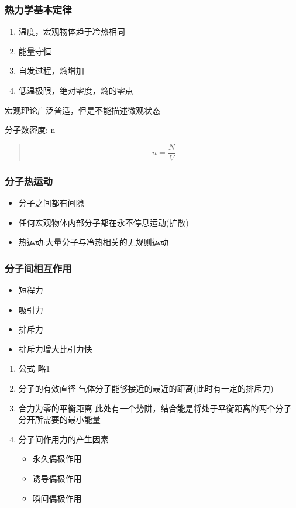 \documentclass[11pt]{article}
\begin{document}
\subsubsection{热力学基本定律}
\label{sec:org59aab5b}
\begin{enumerate}
\item 温度，宏观物体趋于冷热相同
\item 能量守恒
\item 自发过程，熵增加
\item 低温极限，绝对零度，熵的零点
\end{enumerate}

宏观理论广泛普适，但是不能描述微观状态

分子数密度: n
\begin{quote}
\[
n=\frac{N}{V}
\]
\end{quote}

\subsubsection{分子热运动}
\label{sec:org57e761c}
\begin{itemize}
\item 分子之间都有间隙
\item 任何宏观物体内部分子都在永不停息运动(扩散)
\item 热运动:大量分子与冷热相关的无规则运动
\end{itemize}
\subsubsection{分子间相互作用}
\label{sec:org0f028f2}
\begin{itemize}
\item 短程力
\item 吸引力
\item 排斥力
\item 排斥力增大比引力快
\end{itemize}
\begin{enumerate}
\item 公式
\label{sec:orgd2eaaf7}
略1
\item 分子的有效直径
\label{sec:org21d676b}
气体分子能够接近的最近的距离(此时有一定的排斥力)
\item 合力为零的平衡距离
\label{sec:org4580c02}
此处有一个势阱，结合能是将处于平衡距离的两个分子
分开所需要的最小能量
\item 分子间作用力的产生因素
\label{sec:org70cd749}
\begin{itemize}
\item 永久偶极作用
\item 诱导偶极作用
\item 瞬间偶极作用
\end{itemize}
\end{enumerate}
\end{document}
